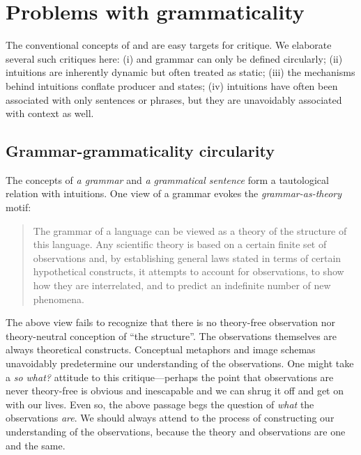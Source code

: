 \section{Problems with grammaticality}

The conventional concepts of  and  are easy targets for critique. We elaborate several such critiques here: (i)  and grammar can only be defined circularly; (ii) intuitions are inherently dynamic but often treated as static; (iii) the mechanisms behind  intuitions conflate producer and  states; (iv) intuitions have often been associated with only sentences or phrases, but they are unavoidably associated with context as well.

\subsection{Grammar-grammaticality circularity}

The concepts of \textit{a grammar} and \textit{a grammatical sentence} form a tautological relation with  intuitions. One view of a grammar evokes the \textit{grammar-as-theory} motif:

\begin{quote}
The grammar of a language can be viewed as a theory of the structure of this language. Any scientific theory is based on a certain finite set of observations and, by establishing general laws stated in terms of certain hypothetical constructs, it attempts to account for observations, to show how they are interrelated, and to predict an indefinite number of new phenomena. \citep[113]{Chomsky1956}
\end{quote}

  The above view fails to recognize that there is no theory-free observation nor theory-neutral conception of “the structure”. The observations themselves are always theoretical constructs. Conceptual metaphors and image schemas unavoidably predetermine our understanding of the observations. One might take a \textit{so what?} attitude to this critique—perhaps the point that observations are never theory-free is obvious and inescapable and we can shrug it off and get on with our lives. Even so, the above passage begs the question of \textit{what} the observations \textit{are}. We should always attend to the process of constructing our understanding of the observations, because the theory and observations are one and the same.

